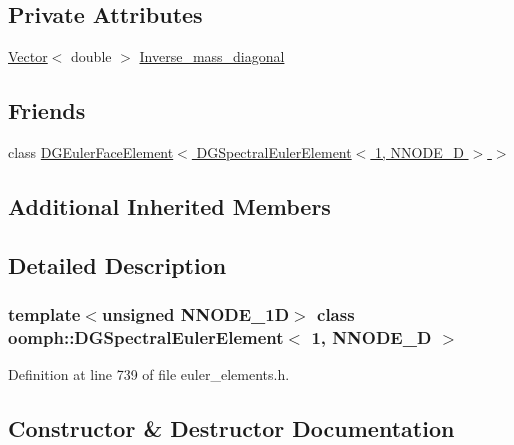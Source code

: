 \subsection*{Private Attributes}
\begin{DoxyCompactItemize}
\item 
\hyperlink{classoomph_1_1Vector}{Vector}$<$ double $>$ \hyperlink{classoomph_1_1DGSpectralEulerElement_3_011_00_01NNODE__1D_01_4_a106e374533359781cfb8a11d9501f4fc}{Inverse\+\_\+mass\+\_\+diagonal}
\end{DoxyCompactItemize}
\subsection*{Friends}
\begin{DoxyCompactItemize}
\item 
class \hyperlink{classoomph_1_1DGSpectralEulerElement_3_011_00_01NNODE__1D_01_4_aeaecacb84a16db526dbfc83a4f730326}{D\+G\+Euler\+Face\+Element$<$ D\+G\+Spectral\+Euler\+Element$<$ 1, N\+N\+O\+D\+E\+\_\+D $>$ $>$}
\end{DoxyCompactItemize}
\subsection*{Additional Inherited Members}


\subsection{Detailed Description}
\subsubsection*{template$<$unsigned N\+N\+O\+D\+E\+\_\+1D$>$\newline
class oomph\+::\+D\+G\+Spectral\+Euler\+Element$<$ 1, N\+N\+O\+D\+E\+\_\+D $>$}



Definition at line 739 of file euler\+\_\+elements.\+h.



\subsection{Constructor \& Destructor Documentation}
\mbox{\label{classoomph_1_1DGSpectralEulerElement_3_011_00_01NNODE__1D_01_4_a092e44aa7ad9c9113d225d7513789e7c}} 
